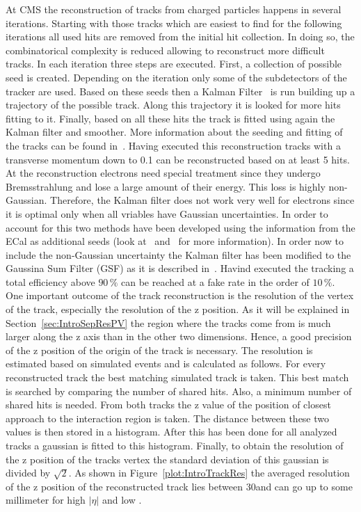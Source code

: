 At CMS the reconstruction of tracks from charged particles happens in several iterations. Starting with those tracks which are easiest to find for the following iterations all used hits are removed from the initial hit collection. In doing so, the combinatorical complexity is reduced allowing to reconstruct more difficult tracks. In each iteration three steps are executed. First, a collection of possible seed is created. Depending on the iteration only some of the subdetectors of the tracker are used. Based on these seeds then a Kalman Filter~\cite{Fruhwirth:1987fm} is run building up a trajectory of the possible track. Along this trajectory it is looked for more hits fitting to it. Finally, based on all these hits the track is fitted using again the Kalman filter and smoother. More information about the seeding and fitting of the tracks can be found in~. Having executed this reconstruction tracks with a transverse momentum down to 0.1\GeVc{} can be reconstructed based on at least 5 hits. At the reconstruction electrons need special treatment since they undergo Bremsstrahlung and lose a large amount of their energy. This loss is highly non-Gaussian. Therefore, the Kalman filter does not work very well for electrons since it is optimal only when all vriables have Gaussian uncertainties. In order to account for this two methods have been developed using the information from the ECal as additional seeds (look at~ and~ for more information). In order now to include the non-Gaussian uncertainty the Kalman filter has been modified to the Gaussina Sum Filter (GSF) as it is described in~. Havind executed the tracking a total efficiency above $90\,\%$ can be reached at a fake rate in the order of $10\,\%$. \\
One important outcome of the track reconstruction is the resolution of the vertex of the track, especially the resolution of the z position. As it will be explained in Section~\ref{sec:IntroSepResPV} the region where the tracks come from is much larger along the z axis than in the other two dimensions. Hence, a good precision of the z position of the origin of the track is necessary. The resolution is estimated based on simulated events and is calculated as follows. For every reconstructed track the best matching simulated track is taken. This best match is searched by comparing the number of shared hits. Also, a minimum number of shared hits is needed. From both tracks the z value of the position of closest approach to the interaction region is taken. The distance between these two values is then stored in a histogram. After this has been done for all analyzed tracks a gaussian is fitted to this histogram. Finally, to obtain the resolution of the z position of the tracks vertex the standard deviation of this gaussian is divided by $\sqrt{2}$.  As shown in Figure~\ref{plot:IntroTrackRes} the averaged resolution of the z position of the reconstructed track lies between 30\mum and can go up to some millimeter for high $\left|\eta\right|$ and low \pt{}.

